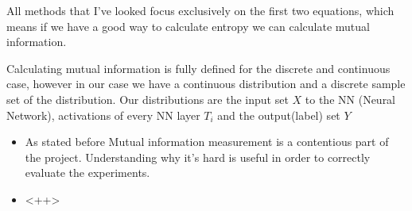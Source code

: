 All methods that I've looked focus exclusively on the first two equations, which
means if we have a good way to calculate entropy we can calculate mutual
information.

Calculating mutual information is fully defined for the discrete and continuous
case, however in our case we have a continuous distribution and a discrete
sample set of the distribution. Our distributions are the input set $X$ to the
NN (Neural Network), activations of every NN layer $T_i$ and the output(label)
set $Y$



\begin{itemize}
  \item{
      As stated before Mutual information measurement is a contentious part of
      the project. Understanding why it's hard is useful in order to correctly
      evaluate the experiments.
    }
  \item{
      <++>
    }
\end{itemize}

